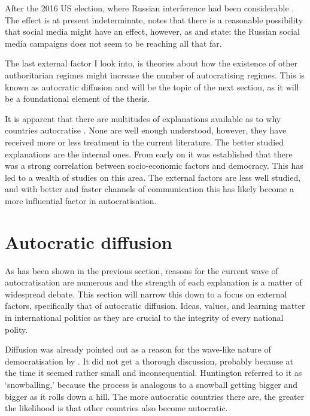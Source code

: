 After the 2016 US election, where Russian interference had been considerable \citep[pp. 14-15]{mueller_report_2019}. The effect is at present indeterminate, \citet{zhuravskaya_political_2020} notes that there is a reasonable possibility that social media might have an effect, however, as \citet{eady_exposure_2023} and \citet{guess_reshares_2023} state: the Russian social media campaigns does not seem to be reaching all that far. 

The last external factor I look into, is theories about how the existence of other authoritarian regimes might increase the number of autocratising regimes. This is known as autocratic diffusion and will be the topic of the next section, as it will be a foundational element of the thesis.

It is apparent that there are multitudes of explanations available as to why countries autocratise \citep{berman_causes_2021}. None are well enough understood, however, they have received more or less treatment in the current literature. The better studied explanations are the internal ones. From early on it was established that there was a strong correlation between socio-economic factors and democracy. This has led to a wealth of studies on this area. The external factors are less well studied, and with better and faster channels of communication this has likely become a more influential factor in autocratisation.

\section{Autocratic diffusion}
As has been shown in the previous section, reasons for the current wave of autocratisation are numerous and the strength of each explanation is a matter of widespread debate. This section will narrow this down to a focus on external factors, specifically that of autocratic diffusion. Ideas, values, and learning matter in international politics \citep[pp. 86-92]{mingst_essentials_2019} as they are crucial to the integrity of every national polity.

Diffusion was already pointed out as a reason for the wave-like nature of democratisation by \citet{huntington_third_1991}. It did not get a thorough discussion, probably because at the time it seemed rather small and inconsequential. Huntington referred to it as `snowballing,' because the process is analogous to a snowball getting bigger and bigger as it rolls down a hill. The more autocratic countries there are, the greater the likelihood is that other countries also become autocratic.

